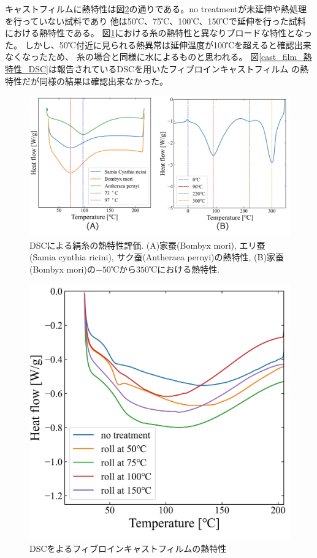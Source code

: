 \documentclass[dvipdfmx,12pt,a4paper]{jreport}
\begin{document}
	キャストフィルムに熱特性は図\ref{cast_film_DSC}の通りである。no treatmentが未延伸や熱処理を行っていない試料であり
	他は50℃、75℃、100℃、150℃で延伸を行った試料における熱特性である。
	図\ref{DSC熱特性評価}における糸の熱特性と異なりブロードな特性となった。
	しかし、50℃付近に見られる熱異常は延伸温度が100℃を超えると確認出来なくなったため、
	糸の場合と同様に水によるものと思われる。
	図\ref{cast_film_熱特性_DSC}は報告されているDSCを用いたフィブロインキャストフィルム
	の熱特性だが同様の結果は確認出来なかった。
	\begin{figure}[h]
		\centering
		\includegraphics[scale=0.8]{DSC_silk_0112_2.jpg}
		\caption{DSCによる絹糸の熱特性評価. (A)家蚕(Bombyx mori), エリ蚕(Samia cynthia ricini), 
		サク蚕(Antheraea pernyi)の熱特性, (B)家蚕(Bombyx mori)の$-50$℃から$350$℃における熱特性.}
		\label{DSC熱特性評価}
	\end{figure}
	\newpage
	\begin{figure}[h]
		\centering
		\includegraphics[scale=1]{cast_film_DSC_20210621.jpg}
		\caption{DSCをよるフィブロインキャストフィルムの熱特性}
		\label{cast_film_DSC}
	\end{figure}
\end{document}
